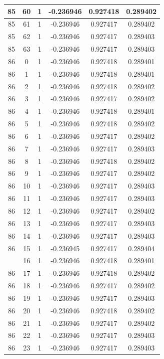 \documentclass[12pt,a4paper]{article}
\numberwithin{equation}{section}
\numberwithin{figure}{section}
\numberwithin{table}{section}
\begin{document}
\begin{longtable}{|c|c|c|c|c|c|}
85 & 60 & 1 & -0.236946 & 0.927418 & 0.289402 \\ \hline
85 & 61 & 1 & -0.236946 & 0.927417 & 0.289402 \\ \hline
85 & 62 & 1 & -0.236946 & 0.927417 & 0.289403 \\ \hline
85 & 63 & 1 & -0.236946 & 0.927417 & 0.289403 \\ \hline
86 & 0 & 1 & -0.236946 & 0.927418 & 0.289401 \\ \hline
86 & 1 & 1 & -0.236946 & 0.927418 & 0.289401 \\ \hline
86 & 2 & 1 & -0.236946 & 0.927418 & 0.289402 \\ \hline
86 & 3 & 1 & -0.236946 & 0.927417 & 0.289402 \\ \hline
86 & 4 & 1 & -0.236946 & 0.927418 & 0.289401 \\ \hline
86 & 5 & 1 & -0.236946 & 0.927418 & 0.289402 \\ \hline
86 & 6 & 1 & -0.236946 & 0.927417 & 0.289402 \\ \hline
86 & 7 & 1 & -0.236946 & 0.927417 & 0.289403 \\ \hline
86 & 8 & 1 & -0.236946 & 0.927418 & 0.289402 \\ \hline
86 & 9 & 1 & -0.236946 & 0.927417 & 0.289402 \\ \hline
86 & 10 & 1 & -0.236946 & 0.927417 & 0.289403 \\ \hline
86 & 11 & 1 & -0.236946 & 0.927417 & 0.289403 \\ \hline
86 & 12 & 1 & -0.236946 & 0.927417 & 0.289402 \\ \hline
86 & 13 & 1 & -0.236946 & 0.927417 & 0.289403 \\ \hline
86 & 14 & 1 & -0.236946 & 0.927417 & 0.289403 \\ \hline
86 & 15 & 1 & -0.236945 & 0.927417 & 0.289404 \\ \hline
\pagebreak
86 & 16 & 1 & -0.236946 & 0.927418 & 0.289401 \\ \hline
86 & 17 & 1 & -0.236946 & 0.927418 & 0.289402 \\ \hline
86 & 18 & 1 & -0.236946 & 0.927417 & 0.289402 \\ \hline
86 & 19 & 1 & -0.236946 & 0.927417 & 0.289403 \\ \hline
86 & 20 & 1 & -0.236946 & 0.927418 & 0.289402 \\ \hline
86 & 21 & 1 & -0.236946 & 0.927417 & 0.289402 \\ \hline
86 & 22 & 1 & -0.236946 & 0.927417 & 0.289403 \\ \hline
86 & 23 & 1 & -0.236946 & 0.927417 & 0.289403 \\ \hline

\end{longtable}
\end{document}
